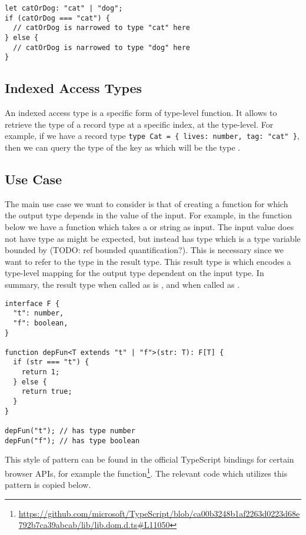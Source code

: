 \begin{lstlisting}
let catOrDog: "cat" | "dog";
if (catOrDog === "cat") {
  // catOrDog is narrowed to type "cat" here
} else {
  // catOrDog is narrowed to type "dog" here
}
\end{lstlisting}

\subsection{Indexed Access Types}

An indexed access type is a specific form of type-level function. It allows to retrieve the type of a record type at a specific index, at the type-level. For example, if we have a record type \lstinline+type Cat = { lives: number, tag: "cat" }+, then we can query the type of the key  as  which will be the type .

\subsection{Use Case}

The main use case we want to consider is that of creating a function for which the output type depends in the value of the input. For example, in the  function below we have a function which takes a  or  string as input. The input value  does not have type  as might be expected, but instead has type  which is a type variable bounded by  (TODO: ref bounded quantification?). This is necessary since we want to refer to the type  in the result type. This result type is  which encodes a type-level mapping for the output type dependent on the input type. In summary, the result type when called as  is , and  when called as .

\begin{lstlisting}
interface F {
  "t": number,
  "f": boolean,
}

function depFun<T extends "t" | "f">(str: T): F[T] {
  if (str === "t") {
    return 1;
  } else {
    return true;
  }
}

depFun("t"); // has type number
depFun("f"); // has type boolean
\end{lstlisting}

This style of pattern can be found in the official TypeScript bindings for certain browser APIs, for example the  function\footnote{\url{https://github.com/microsoft/TypeScript/blob/ca00b3248b1af2263d0223d68e792b7ca39abcab/lib/lib.dom.d.ts\#L11050}}. The relevant code which utilizes this pattern is copied below.

